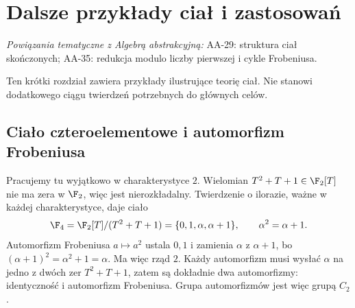 \chapter{Dalsze przykłady ciał i zastosowań}

\providecommand{\atlasref}[2]{#2}
\noindent\emph{Powiązania tematyczne z Algebrą abstrakcyjną:} \atlasref{AA-29::aa:ch:finite-fields-structure}{AA-29: struktura ciał skończonych}; \atlasref{AA-35::aa:ch:frobenius-reduction}{AA-35: redukcja modulo liczby pierwszej i cykle Frobeniusa}.


Ten krótki rozdział zawiera przykłady ilustrujące teorię ciał. Nie stanowi dodatkowego ciągu twierdzeń potrzebnych do głównych celów.

\section{Ciało czteroelementowe i automorfizm Frobeniusa}

Pracujemy tu wyjątkowo w charakterystyce $2$. Wielomian $T^2+T+1\in\F_2[T]$ nie ma zera w $\F_2$, więc jest nierozkładalny. Twierdzenie o ilorazie, ważne w każdej charakterystyce, daje ciało
\[
\F_4=\F_2[T]/(T^2+T+1)=\{0,1,\alpha,\alpha+1\},\qquad \alpha^2=\alpha+1.
\]
Automorfizm Frobeniusa $a\mapsto a^2$ ustala $0,1$ i zamienia $\alpha$ z $\alpha+1$, bo $(\alpha+1)^2=\alpha^2+1=\alpha$. Ma więc rząd $2$. Każdy automorfizm musi wysłać $\alpha$ na jedno z dwóch zer $T^2+T+1$, zatem są dokładnie dwa automorfizmy: identyczność i automorfizm Frobeniusa. Grupa automorfizmów jest więc grupą $C_2$.

